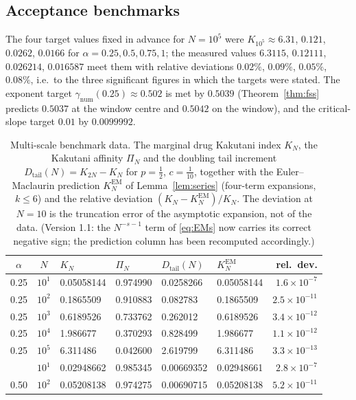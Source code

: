 \documentclass[11pt,reqno]{amsart}
\theoremstyle{plain}
\theoremstyle{definition}
\theoremstyle{remark}
\numberwithin{equation}{section}
\newcommand{\Dtail}{D_{\mathrm{tail}}}
\newcommand{\gnum}{\gamma_{\mathrm{num}}}
\begin{document}
\subsection*{Acceptance benchmarks}
The four target values fixed in advance for $N=10^5$ were $K_{10^5}\approx6.31$, $0.121$, $0.0262$, $0.0166$ for $\alpha=0.25,0.5,0.75,1$; the measured values $6.3115$, $0.12111$, $0.026214$, $0.016587$ meet them with relative deviations $0.02\%$, $0.09\%$, $0.05\%$, $0.08\%$, i.e.\ to the three significant figures in which the targets were stated. The exponent target $\gnum(0.25)\approx0.502$ is met by $0.5039$ (Theorem~\ref{thm:fss} predicts $0.5037$ at the window centre and $0.5042$ on the window), and the critical-slope target $0.01$ by $0.0099992$.

\begin{table}[p]
\centering\small
\caption{Multi-scale benchmark data. The marginal drug Kakutani index $K_N$, the Kakutani affinity $\Pi_N$ and the doubling tail increment $\Dtail(N)=K_{2N}-K_N$ for $p=\tfrac12$, $c=\tfrac1{10}$, together with the Euler--Maclaurin prediction $K_N^{\mathrm{EM}}$ of Lemma~\ref{lem:series} (four-term expansions, $k\le6$) and the relative deviation $(K_N-K_N^{\mathrm{EM}})/K_N$. The deviation at $N=10$ is the truncation error of the asymptotic expansion, not of the data. (Version 1.1: the $N^{-s-1}$ term of \eqref{eq:EMs} now carries its correct negative sign; the prediction column has been recomputed accordingly.)}
\label{tab:bench}
\begin{tabular}{@{}ccllllr@{}}
\toprule
$\alpha$ & $N$ & $K_N$ & $\Pi_N$ & $\Dtail(N)$ & $K_N^{\mathrm{EM}}$ & rel.\ dev. \\
\midrule
0.25 & $10^{1}$ & 0.05058144 & 0.974990 & 0.0258266 & 0.05058144 & $1.6\times10^{-7}$ \\
0.25 & $10^{2}$ & 0.1865509 & 0.910883 & 0.082783 & 0.1865509 & $2.5\times10^{-11}$ \\
0.25 & $10^{3}$ & 0.6189526 & 0.733762 & 0.262012 & 0.6189526 & $3.4\times10^{-12}$ \\
0.25 & $10^{4}$ & 1.986677 & 0.370293 & 0.828499 & 1.986677 & $1.1\times10^{-12}$ \\
0.25 & $10^{5}$ & 6.311486 & 0.042600 & 2.619799 & 6.311486 & $3.3\times10^{-13}$ \\
\addlinespace
0.50 & $10^{1}$ & 0.02948662 & 0.985345 & 0.00669352 & 0.02948661 & $2.8\times10^{-7}$ \\
0.50 & $10^{2}$ & 0.05208138 & 0.974275 & 0.00690715 & 0.05208138 & $5.2\times10^{-11}$ \\

\end{tabular}
\end{table}
\end{document}
